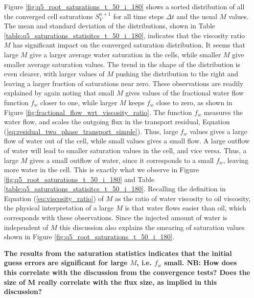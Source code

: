 Figure \ref{fig:q5_root_saturations_t_50_i_180} shows a sorted distribution of all the converged cell saturations $S_V^{n+1}$ for all time steps $\Delta t$ and the usual $M$ values. The mean and standard deviation of the distributions, shown in Table \ref{table:q5_saturations_statisitcs_t_50_i_180}, indicates that the viscosity ratio $M$ has significant impact on the converged saturation distribution. It seems that large $M$ give a larger average water saturation in the cells, while smaller $M$ give smaller average saturation values. The trend in the shape of the distribution is even clearer, with larger values of $M$ pushing the distribution to the right and leaving a larger fraction of saturations near zero. These observations are readily explained by again noting that small $M$ gives values of the fractional water flow function $f_w$ closer to one, while larger $M$ keeps $f_w$ close to zero, as shown in Figure \ref{fig:fractional_flow_wrt_viscosity_ratio}. The function $f_w$ measures the water flow, and scales the outgoing flux in the transport residual, Equation (\ref{eq:residual_two_phase_transport_simple}). Thus, large $f_w$ values gives a large flow of water out of the cell, while small values gives a small flow. A large outflow of water will lead to smaller saturation values in the cell, and vice versa. Thus, a large $M$ gives a small outflow of water, since it corresponds to a small $f_w$, leaving more water in the cell. This is exactly what we observe in Figure \ref{fig:q5_root_saturations_t_50_i_180} and Table \ref{table:q5_saturations_statisitcs_t_50_i_180}. Recalling the definition in Equation (\ref{eq:viscosity_ratio}) of $M$ as the ratio of water viscosity to oil viscosity, the physical interpretation of a large $M$ is that water flows easier than oil, which corresponds with these observations. Since the injected amount of water is independent of $M$ this discussion also explains the smearing of saturation values shown in Figure \ref{fig:q5_root_saturations_t_50_i_180}.


\textbf{The results from the saturation statistics indicates that the initial guess errors are significant for large $M$, i.e. $f_w$ small. NB: How does this correlate with the discussion from the convergence tests? Does the size of M really correlate with the flux size, as implied in this discussion?}



\clearpage
